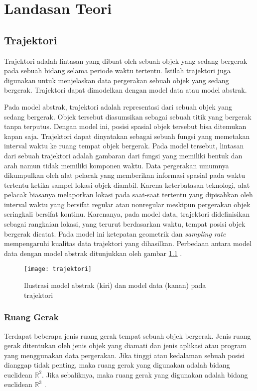  \chapter{Landasan Teori}
\label{chap:teori}

\section{Trajektori}
\label{sec:trajektori}
Trajektori adalah lintasan yang dibuat oleh sebuah objek yang sedang bergerak pada sebuah bidang selama periode waktu tertentu. Istilah trajektori juga digunakan untuk menjelaskan data pergerakan sebuah objek yang sedang bergerak. Trajektori dapat dimodelkan dengan model data atau model abstrak.
 
\par Pada model abstrak, trajektori adalah representasi dari sebuah objek yang sedang bergerak. Objek tersebut diasumsikan sebagai sebuah titik yang bergerak tanpa terputus. Dengan model ini, posisi spasial objek tersebut bisa ditemukan kapan saja. Trajektori dapat dinyatakan sebagai sebuah fungsi yang memetakan interval waktu ke ruang tempat objek bergerak. Pada model tersebut, lintasan dari sebuah trajektori adalah gambaran dari fungsi yang memiliki bentuk dan arah namun tidak memiliki komponen waktu. Data pergerakan umumnya dikumpulkan oleh alat pelacak yang memberikan informasi spasial pada waktu tertentu ketika sampel lokasi objek diambil. Karena keterbatasan teknologi, alat pelacak biasanya melaporkan lokasi pada saat-saat tertentu yang dipisahkan oleh interval waktu yang bersifat regular atau nonregular meskipun pergerakan objek seringkali bersifat kontinu. Karenanya, pada model data, trajektori didefinisikan sebagai rangkaian lokasi, yang terurut berdasarkan waktu, tempat posisi objek bergerak dicatat. Pada model ini ketepatan geometrik dan \textit{sampling rate} mempengaruhi kualitas data trajektori yang dihasilkan. Perbedaan antara model data dengan model abstrak ditunjukkan oleh gambar \ref{fig:model} \cite{wiratma:19:computations}.

\begin{figure}[H]
	\centering  
	\texttt{[image: trajektori]}  
	\caption{Ilustrasi model abstrak (kiri) dan model data (kanan) pada trajektori} 
	\label{fig:model} 
\end{figure}

\subsection{Ruang Gerak}
Terdapat beberapa jenis ruang gerak tempat sebuah objek bergerak. Jenis ruang gerak ditentukan oleh jenis objek yang diamati dan jenis aplikasi atau program yang menggunakan data pergerakan. Jika tinggi atau kedalaman sebuah posisi dianggap tidak penting, maka ruang gerak yang digunakan adalah bidang euclidean $\mathbb{R}^{2}$. Jika sebaliknya, maka ruang gerak yang digunakan adalah bidang euclidean $\mathbb{R}^{3}$ \cite{wiratma:19:computations}.

